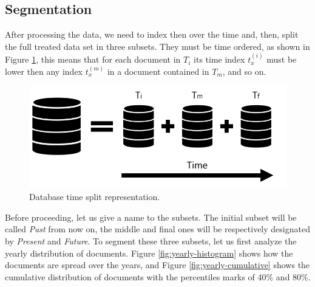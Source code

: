 \subsection{Segmentation}

After processing the data, we need to index then over the time and, then, split the full treated data set in three subsets. They must be time ordered, as shown in Figure \ref{fig:database}, this means that for each document in $T_{i}$ its time index $t_{x}^{(i)}$ must be lower then any index $t_{x}^{(m)}$ in a document contained in $T_{m}$, and so on.

\begin{figure}[h!]
	\centering
	\includegraphics[width=0.5\linewidth]{01.Chapters/04.Materials/database}
	\caption{Database time split representation.}
	\label{fig:database}
\end{figure}

Before proceeding, let us give a name to the subsets. The initial subset will be called \textit{Past} from now on, the middle and final ones will be respectively designated by \textit{Present} and \textit{Future}. To segment these three subsets, let us first analyze the yearly distribution of documents. Figure \ref{fig:yearly-histogram} shows how the documents are spread over the years, and Figure \ref{fig:yearly-cumulative} shows the cumulative distribution of documents with the percentiles marks of 40\% and 80\%.

